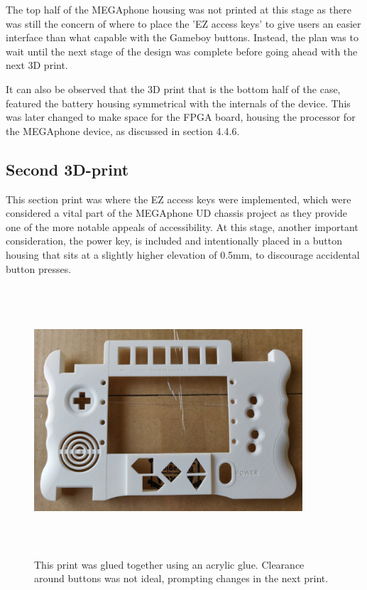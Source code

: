 The top half of the MEGAphone housing was not printed at this stage as there was still the concern of where to place the 'EZ access keys' to give users an easier interface than what capable with the Gameboy buttons.
Instead, the plan was to wait until the next stage of the design was complete before going ahead with the next 3D print.

It can also be observed that the 3D print that is the bottom half of the case, featured the battery housing symmetrical with the internals of the device.
This was later changed to make space for the FPGA board, housing the processor for the MEGAphone device, as discussed in section 4.4.6.

\subsection{Second 3D-print}

This section print was where the EZ access keys were implemented, which were considered a vital part of the MEGAphone UD chassis project as they provide one of the more notable appeals of accessibility.
At this stage, another important consideration, the power key, is included and intentionally placed in a button housing that sits at a slightly higher elevation of 0.5mm, to discourage accidental button presses.

\begin{figure} [h]
    \centering
    \includegraphics[width=10cm,height=10cm,keepaspectratio]{Figures/secondprint.png}
    \caption{This print was glued together using an acrylic glue. Clearance around buttons was not ideal, prompting changes in the next print.}
    \label{fig:Second}
\end{figure}

